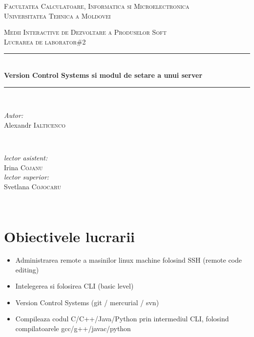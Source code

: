 \documentclass[12pt]{article}
\begin{document}
\begin{titlepage}
\begin{center} 
 \textsc{\large Facultatea Calculatoare, Informatica si Microelectronica}\\[0.5cm]
\textsc{\large Universitatea Tehnica a Moldovei}\\[1.2cm] 
\vspace{25 mm}

\textsc{\Large Medii Interactive de Dezvoltare a Produselor Soft}\\[0.5cm] 
\textsc{\large Lucrarea de laborator\#2}\\[0.5cm] \newcommand{\HRule}{\rule{\linewidth}{0.5mm}} 
  \vspace{10 mm}
  \HRule \\[0.4cm]
  { \LARGE \bfseries Version Control Systems si modul de setare a unui server  }\\[0.4cm] 
  \HRule \\[1.5cm]
      \vspace{30mm}

      \begin{minipage}{0.4\textwidth}
      \begin{flushleft} \large
      \emph{Autor:}\\
      Alexandr \textsc{Ialticenco}
      \end{flushleft}
      \end{minipage}
      ~
      \begin{minipage}{0.4\textwidth}
      \begin{flushright} \large
      \emph{lector asistent:} \\
      Irina \textsc{Cojanu} \\ 
      \emph{lector superior:} \\
      Svetlana \textsc{Cojocaru} 
      \end{flushright}
      \end{minipage}\\[4cm]

      \vspace{5 mm}

      \vfill
      \end{center}
      
\end{titlepage}
\section*{Obiectivele lucrarii}
\begin{itemize}
\item Administrarea remote a masinilor linux machine folosind SSH (remote code editing)
\item Intelegerea si folosirea CLI (basic level)
\item Version Control Systems (git / mercurial / svn)
\item Compileaza codul C/C++/Java/Python prin intermediul CLI, folosind compilatoarele gcc/g++/javac/python
\end{itemize}
\end{document}
